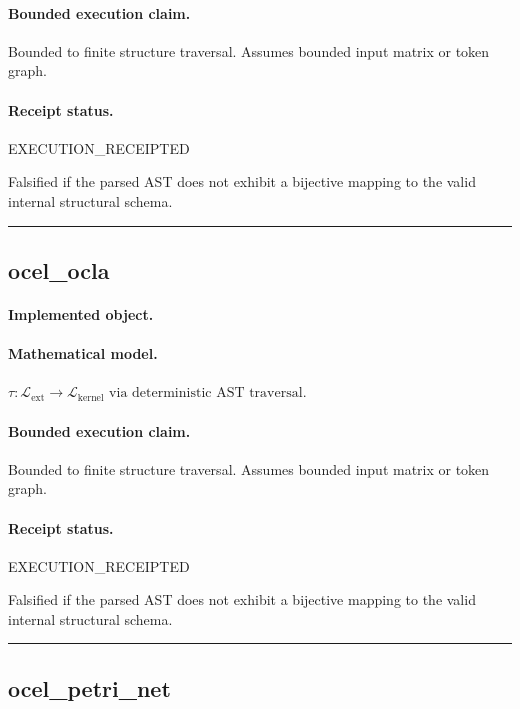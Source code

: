 \paragraph{Bounded execution claim.} Bounded to finite structure traversal. Assumes bounded input matrix or token graph.
\paragraph{Receipt status.} EXECUTION\_RECEIPTED
\begin{falsifier}
Falsified if the parsed AST does not exhibit a bijective mapping to the valid internal structural schema.
\end{falsifier}

\vspace{1em}\hrule\vspace{1em}
\subsection{ocel\_ocla}
\paragraph{Implemented object.} 
\paragraph{Mathematical model.} $\tau : \mathcal{L}_{\text{ext}} \to \mathcal{L}_{\text{kernel}} \text{ via deterministic AST traversal}.$
\paragraph{Bounded execution claim.} Bounded to finite structure traversal. Assumes bounded input matrix or token graph.
\paragraph{Receipt status.} EXECUTION\_RECEIPTED
\begin{falsifier}
Falsified if the parsed AST does not exhibit a bijective mapping to the valid internal structural schema.
\end{falsifier}

\vspace{1em}\hrule\vspace{1em}
\subsection{ocel\_petri\_net}
